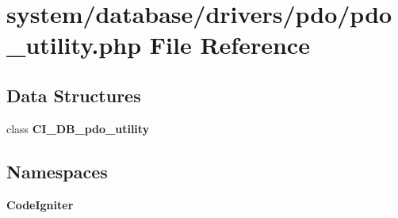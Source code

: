 \section{system/database/drivers/pdo/pdo\-\_\-utility.php File Reference}
\label{pdo__utility_8php}
\subsection*{Data Structures}
\begin{DoxyCompactItemize}
\item 
class {\bf C\-I\-\_\-\-D\-B\-\_\-pdo\-\_\-utility}
\end{DoxyCompactItemize}
\subsection*{Namespaces}
\begin{DoxyCompactItemize}
\item 
{\bf Code\-Igniter}
\end{DoxyCompactItemize}
